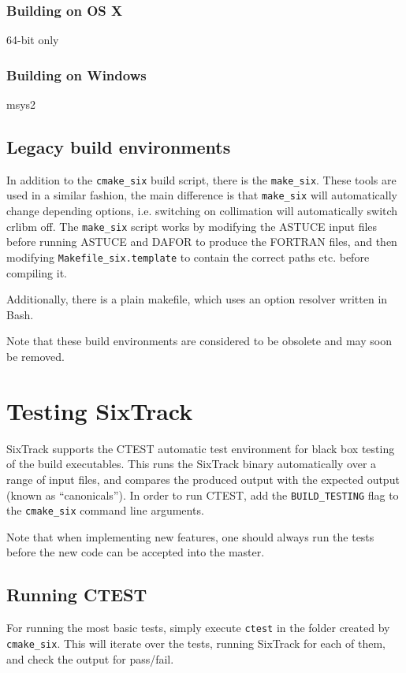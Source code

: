 \documentclass[english]{article}
\begin{document}
\subsubsection{Building on OS X}

64-bit only

\subsubsection{Building on Windows}

msys2

\subsection{Legacy build environments}

In addition to the \texttt{cmake\_six} build script, there is the \texttt{make\_six}.
These tools are used in a similar fashion, the main difference is that \texttt{make\_six} will automatically change depending options, i.e. switching on collimation will automatically switch crlibm off.
The \texttt{make\_six} script works by modifying the ASTUCE input files before running ASTUCE and DAFOR to produce the FORTRAN files, and then modifying \texttt{Makefile\_six.template} to contain the correct paths etc. before compiling it.

Additionally, there is a plain makefile, which uses an option resolver written in Bash.

Note that these build environments are considered to be obsolete and may soon be removed.

\section{Testing SixTrack}

SixTrack supports the CTEST automatic test environment for black box testing of the build executables.
This runs the SixTrack binary automatically over a range of input files, and compares the produced output with the expected output (known as ``canonicals'').
In order to run CTEST, add the \texttt{BUILD\_TESTING} flag to the \texttt{cmake\_six} command line arguments.

Note that when implementing new features, one should always run the tests before the new code can be accepted into the master.

\subsection{Running CTEST}
For running the most basic tests, simply execute \texttt{ctest} in the folder created by \texttt{cmake\_six}.
This will iterate over the tests, running SixTrack for each of them, and check the output for pass/fail.
\end{document}
